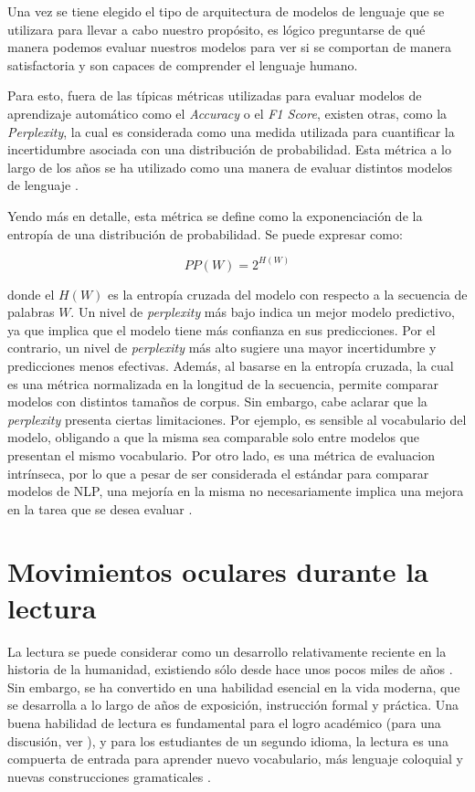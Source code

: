 Una vez se tiene elegido el tipo de arquitectura de modelos de lenguaje que se utilizara para llevar a cabo nuestro propósito, es lógico preguntarse de qué manera podemos evaluar nuestros modelos para ver si se comportan de manera satisfactoria y son capaces de comprender el lenguaje humano.

Para esto, fuera de las típicas métricas utilizadas para evaluar modelos de aprendizaje automático como el \textit{Accuracy} o el \textit{F1 Score}, existen otras, como la \textit{Perplexity}, la cual es considerada como una medida utilizada para cuantificar la incertidumbre asociada con una distribución de probabilidad. Esta métrica a lo largo de los años se ha utilizado como una manera de evaluar distintos modelos de lenguaje \parencite{merity2017regularizingoptimizinglstmlanguage}.

Yendo más en detalle, esta métrica se define como la exponenciación de la entropía de una distribución de probabilidad. Se puede expresar como:

\[
PP(W) = 2^{H(W)}
\]

donde el $H(W)$ es la entropía cruzada del modelo con respecto a la secuencia de palabras $W$. Un nivel de \textit{perplexity} más bajo indica un mejor modelo predictivo, ya que implica que el modelo tiene más confianza en sus predicciones. Por el contrario, un nivel de \textit{perplexity} más alto sugiere una mayor incertidumbre y predicciones menos efectivas. Además, al basarse en la entropía cruzada, la cual es una métrica normalizada en la longitud de la secuencia, permite comparar modelos con distintos tamaños de corpus. Sin embargo, cabe aclarar que la \textit{perplexity} presenta ciertas limitaciones. Por ejemplo, es sensible al vocabulario del modelo, obligando a que la misma sea comparable solo entre modelos que presentan el mismo vocabulario. Por otro lado, es una métrica de evaluacion intrínseca, por lo que a pesar de ser considerada el estándar para comparar modelos de NLP, una mejoría en la misma no necesariamente implica una mejora en la tarea que se desea evaluar \parencite{jurafsky2000speech}.

\section{Movimientos oculares durante la lectura}

La lectura se puede considerar como un desarrollo relativamente reciente en la historia de la humanidad, existiendo sólo desde hace unos pocos miles de años \parencite{ImmordinoYangDeacon2007}. Sin embargo, se ha convertido en una habilidad esencial en la vida moderna, que se desarrolla a lo largo de años de exposición, instrucción formal y práctica.
Una buena habilidad de lectura es fundamental para el logro académico (para una discusión, ver \textcite{Renadya}), y para los estudiantes de un segundo idioma, la lectura es una compuerta de entrada para aprender nuevo vocabulario, más lenguaje coloquial y nuevas construcciones gramaticales \parencite{wilkinson}.

